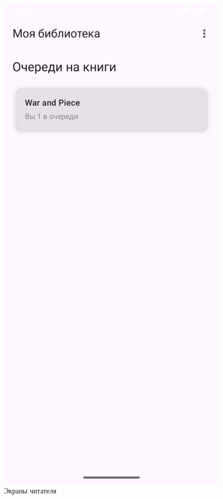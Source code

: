 \begin{figure}[H]
	\includegraphics[scale=0.125]{img/queue.png}
	\caption{Экраны читателя}
\end{figure}

